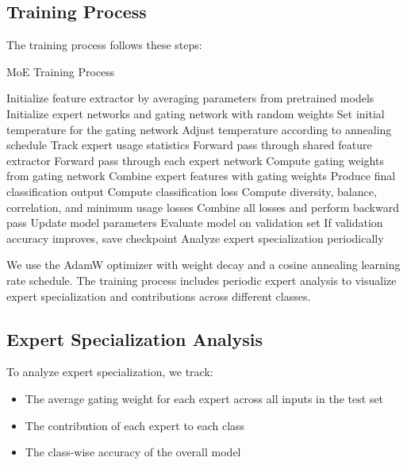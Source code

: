 \documentclass[conference]{IEEEtran}
\begin{document}
\subsection{Training Process}
The training process follows these steps:

\begin{algorithm}
\caption{MoE Training Process}
\begin{algorithmic}[1]
\State Initialize feature extractor by averaging parameters from pretrained models
\State Initialize expert networks and gating network with random weights
\State Set initial temperature for the gating network
    \State Adjust temperature according to annealing schedule
    \State Track expert usage statistics
        \State Forward pass through shared feature extractor
        \State Forward pass through each expert network
        \State Compute gating weights from gating network
        \State Combine expert features with gating weights
        \State Produce final classification output
        \State Compute classification loss
        \State Compute diversity, balance, correlation, and minimum usage losses
        \State Combine all losses and perform backward pass
        \State Update model parameters
    \EndFor
    \State Evaluate model on validation set
    \State If validation accuracy improves, save checkpoint
    \State Analyze expert specialization periodically
\EndFor
\end{algorithmic}
\end{algorithm}

We use the AdamW optimizer with weight decay and a cosine annealing learning rate schedule. The training process includes periodic expert analysis to visualize expert specialization and contributions across different classes.

\subsection{Expert Specialization Analysis}
To analyze expert specialization, we track:
\begin{itemize}
    \item The average gating weight for each expert across all inputs in the test set
    \item The contribution of each expert to each class
    \item The class-wise accuracy of the overall model
\end{itemize}
\end{document}
